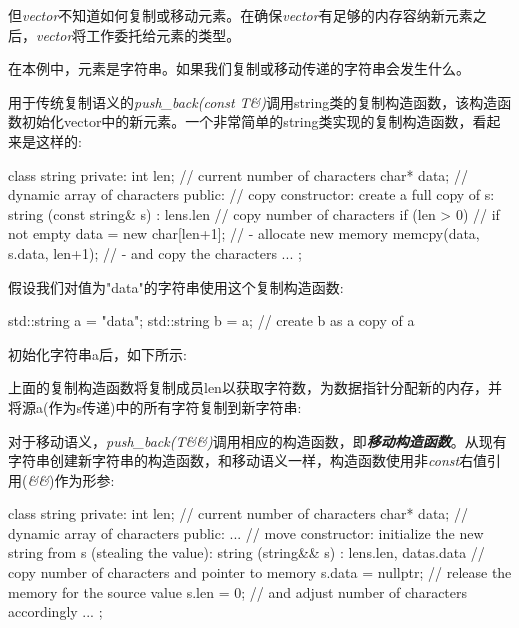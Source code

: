 但\textit{vector}不知道如何复制或移动元素。在确保\textit{vector}有足够的内存容纳新元素之后，\textit{vector}将工作委托给元素的类型。\par

在本例中，元素是字符串。如果我们复制或移动传递的字符串会发生什么。\par


用于传统复制语义的\textit{push\_\allowbreak{}back(\allowbreak{}const T\&)\allowbreak{}}调用string类的复制构造函数，该构造函数初始化vector中的新元素。一个非常简单的string类实现的复制构造函数，看起来是这样的:\par

\begin{codebox}[cpp]
class string {
  private:
  int len; // current number of characters
  char* data; // dynamic array of characters
  public:
  // copy constructor: create a full copy of s:
  string (const string& s)
  : len{s.len} { // copy number of characters
    if (len > 0) { // if not empty
      data = new char[len+1]; // - allocate new memory
      memcpy(data, s.data, len+1); // - and copy the characters
    }
  }
  ...
};
\end{codebox}

假设我们对值为"data"的字符串使用这个复制构造函数:\par

\begin{codebox}[cpp]
std::string a = "data";
std::string b = a; // create b as a copy of a
\end{codebox}

初始化字符串a后，如下所示:\par


上面的复制构造函数将复制成员len以获取字符数，为数据指针分配新的内存，并将源a(作为s传递)中的所有字符复制到新字符串:\par



对于移动语义，\textit{push\_\allowbreak{}back(\allowbreak{}T\&\&)\allowbreak{}}调用相应的构造函数，即\textit{\textbf{移动构造函数}}。从现有字符串创建新字符串的构造函数，和移动语义一样，构造函数使用非\textit{const}右值引用(\textit{\&\&})作为形参:\par

\begin{codebox}[cpp]
class string {
  private:
  int len; // current number of characters
  char* data; // dynamic array of characters
  public:
  ...
  // move constructor: initialize the new string from s (stealing the value):
  string (string&& s)
  : len{s.len}, data{s.data} { // copy number of characters and pointer to memory
    s.data = nullptr; // release the memory for the source value
    s.len = 0; // and adjust number of characters accordingly
  }
  ...
};
\end{codebox}


